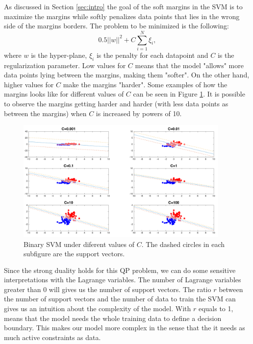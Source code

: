 \label{sec:complexity}

As discussed in Section \ref{sec:intro} the goal of the soft margins in the SVM is to maximize the margins while softly penalizes data points that lies in the wrong side of the margins borders.
The problem to be minimized is the following:
\begin{equation}
  0.5 ||w||^2 + C \sum_{i=1}^{N}\xi_i,
\end{equation}
where $w$ is the hyper-plane, $\xi_i$ is the penalty for each datapoint and $C$ is the regularization parameter.
Low values for $C$ means that the model "allows" more data points lying between the margins, making them "softer".
On the other hand, higher values for $C$ make the margins "harder".
Some examples of how the margins looks like for different values of $C$ can be seen in Figure \ref{fig:svm}.
It is possible to observe the margins getting harder and harder (with less data points as between the margins) when $C$ is increased by powers of 10.

\begin{figure}[!htb]
\begin{center}
\includegraphics [width=10.5cm] {./graphics/SVM_PLOT.png}
\caption{Binary SVM under diferent values of $C$. The dashed circles in each subfigure are the support vectors.} \label{fig:svm}
\end{center}
\end{figure}

Since the strong duality holds for this QP problem, we can do some sensitive interpretations with the Lagrange variables.
The number of Lagrange variables greater than $0$ will gives us the number of support vectors.
The ratio $r$ between the number of support vectors and the number of data to train the SVM can gives us an intuition about the complexity of the model.
With $r$ equals to 1, means that the model needs the whole training data to define a decision boundary.
This makes our model more complex in the sense that the it needs as much active constraints as data.

